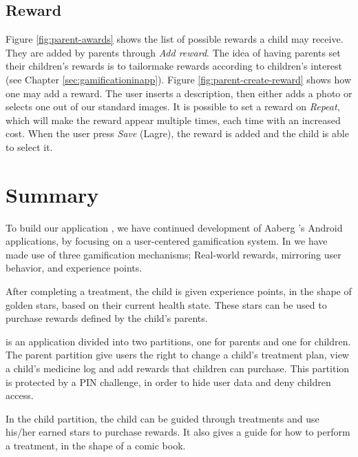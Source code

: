 \subsection{Reward}
\label{sec:description-manage-rewards}
Figure \ref{fig:parent-awards} shows the list of possible rewards a child may receive. They are added by parents through \emph{Add reward}. The idea of having parents set their children's rewards is to tailormake rewards according to children's interest (see Chapter \ref{sec:gamificationinapp}). Figure \ref{fig:parent-create-reward} shows how one may add a reward. The user inserts a description, then either adds a photo or selects one out of our standard images. It is possible to set a reward on \emph{Repeat}, which will make the reward appear multiple times, each time with an increased cost.        
When the user press \emph{Save} (Lagre), the reward is added and the child is able to select it. 
 
\section{Summary}

To build our application \app{}, we have continued development of Aaberg \etal{}'s Android applications, by focusing on a user-centered gamification system. In \app{} we have made use of three gamification mechanisms; Real-world rewards, mirroring user behavior, and experience points. 

After completing a treatment, the child is given experience points, in the shape of golden stars, based on their current health state. These stars can be used to purchase rewards defined by the child's parents. 

\app{} is an application divided into two partitions, one for parents and one for children. The parent partition give users the right to change a child's treatment plan, view a child's medicine log and add rewards that children can purchase. This partition is protected by a PIN challenge, in order to hide user data and deny children access. 

In the child partition, the child can be guided through treatments and use his/her earned stars to purchase rewards. It also gives a guide for how to perform a treatment, in the shape of a comic book.   
